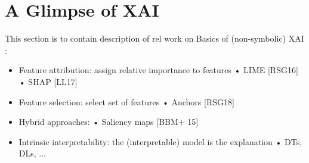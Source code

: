 \section{A  Glimpse of XAI} \label{sec:glimpsexai}

This section is to contain description of rel work on Basics of (non-symbolic) XAI :

\begin{itemize} 
\item Feature attribution: assign relative importance to features
• LIME [RSG16]
• SHAP [LL17]

\item Feature selection: select set of features
• Anchors [RSG18]


\item Hybrid approaches:
• Saliency maps [BBM+ 15]


\item Intrinsic interpretability: the (interpretable) model is the explanation 
• DTs, DLs, ...

\end{itemize}
